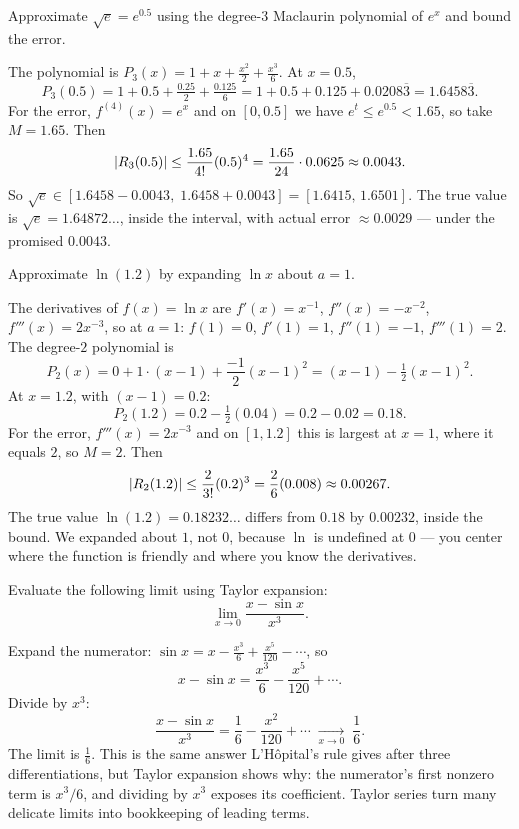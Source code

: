 \begin{example}
\label{ch31:ex-sqrt-e}
Approximate $\sqrt{e} = e^{0.5}$ using the degree-$3$ Maclaurin polynomial of $e^x$
and bound the error.

The polynomial is $P_3(x) = 1 + x + \tfrac{x^2}{2} + \tfrac{x^3}{6}$. At $x=0.5$,
\[
  P_3(0.5) = 1 + 0.5 + \tfrac{0.25}{2} + \tfrac{0.125}{6}
           = 1 + 0.5 + 0.125 + 0.0208\overline{3} = 1.6458\overline{3}.
\]
For the error, $f^{(4)}(x) = e^x$ and on $[0,0.5]$ we have
$e^t \le e^{0.5} < 1.65$, so take $M = 1.65$. Then
\[
  \lvert R_3(0.5)\rvert \le \frac{1.65}{4!}(0.5)^4
  = \frac{1.65}{24}\cdot 0.0625 \approx 0.0043.
\]
So $\sqrt{e} \in [1.6458 - 0.0043,\; 1.6458 + 0.0043] = [1.6415,\, 1.6501]$. The true
value is $\sqrt{e} = 1.64872\ldots$, inside the interval, with actual error
$\approx 0.0029$ --- under the promised $0.0043$.
\end{example}

\begin{example}
\label{ch31:ex-ln}
Approximate $\ln(1.2)$ by expanding $\ln x$ about $a = 1$.

The derivatives of $f(x) = \ln x$ are $f'(x) = x^{-1}$, $f''(x) = -x^{-2}$,
$f'''(x) = 2x^{-3}$, so at $a=1$: $f(1)=0$, $f'(1)=1$, $f''(1)=-1$, $f'''(1)=2$. The
degree-$2$ polynomial is
\[
  P_2(x) = 0 + 1\cdot(x-1) + \frac{-1}{2}(x-1)^2 = (x-1) - \tfrac12(x-1)^2.
\]
At $x = 1.2$, with $(x-1) = 0.2$:
\[
  P_2(1.2) = 0.2 - \tfrac12(0.04) = 0.2 - 0.02 = 0.18.
\]
For the error, $f'''(x) = 2x^{-3}$ and on $[1, 1.2]$ this is largest at $x=1$, where
it equals $2$, so $M = 2$. Then
\[
  \lvert R_2(1.2)\rvert \le \frac{2}{3!}(0.2)^3 = \frac{2}{6}(0.008) \approx 0.00267.
\]
The true value $\ln(1.2) = 0.18232\ldots$ differs from $0.18$ by $0.00232$, inside
the bound. We expanded about $1$, not $0$, because $\ln$ is undefined at $0$ ---
you center where the function is friendly and where you know the derivatives.
\end{example}

\begin{example}
\label{ch31:ex-limit}
Evaluate the following limit using Taylor expansion:
\[
  \lim_{x\to 0}\frac{x - \sin x}{x^3}.
\]

Expand the numerator: $\sin x = x - \tfrac{x^3}{6} + \tfrac{x^5}{120} - \cdots$, so
\[
  x - \sin x = \frac{x^3}{6} - \frac{x^5}{120} + \cdots.
\]
Divide by $x^3$:
\[
  \frac{x - \sin x}{x^3} = \frac{1}{6} - \frac{x^2}{120} + \cdots
  \;\xrightarrow[x\to 0]{}\; \frac{1}{6}.
\]
The limit is $\tfrac16$. This is the same answer L'H\^opital's rule gives after three
differentiations, but Taylor expansion shows why: the
numerator's first nonzero term is $x^3/6$, and dividing by $x^3$ exposes its
coefficient. Taylor series turn many delicate limits into bookkeeping of leading
terms.
\end{example}

